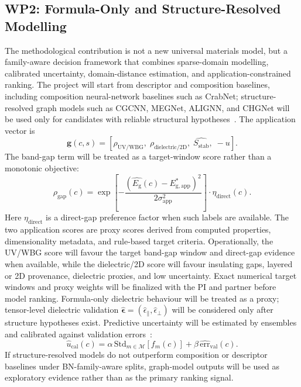 \documentclass[10pt,a4paper]{article}
\newcommand{\eg}{E_{\mathrm{g}}}
\newcommand{\unc}{u}
\newcommand{\stab}{S_{\mathrm{stab}}}
\newcommand{\gapscore}{\rho_{\mathrm{gap}}}
\begin{document}
\subsection{WP2: Formula-Only and Structure-Resolved Modelling}
The methodological contribution is not a new universal materials model, but a family-aware decision framework that combines sparse-domain modelling, calibrated uncertainty, domain-distance estimation, and application-constrained ranking. The project will start from descriptor and composition baselines, including composition neural-network baselines such as CrabNet; structure-resolved graph models such as CGCNN, MEGNet, ALIGNN, and CHGNet will be used only for candidates with reliable structural hypotheses~\cite{ong2013_pymatgen,wang2021_crabnet,xie2018_cgcnn,chen2019_megnet,choudhary2021_alignn,deng2023_chgnet}. The application vector is
\[
  \mathbf{g}(c,s)=
  [\rho_{\mathrm{UV/WBG}},\;\rho_{\mathrm{dielectric/2D}},\;
  \hat{\stab},\;-\unc].
\]
The band-gap term will be treated as a target-window score rather than a monotonic objective:
\[
  \gapscore(c)=
  \exp\!\left[-\frac{(\hat{\eg}(c)-E^*_{\mathrm{g,app}})^2}{2\sigma_{\mathrm{app}}^2}\right]
  \cdot\eta_{\mathrm{direct}}(c).
\]
Here $\eta_{\mathrm{direct}}$ is a direct-gap preference factor when such labels are available. The two application scores are proxy scores derived from computed properties, dimensionality metadata, and rule-based target criteria. Operationally, the UV/WBG score will favour the target band-gap window and direct-gap evidence when available, while the dielectric/2D score will favour insulating gaps, layered or 2D provenance, dielectric proxies, and low uncertainty. Exact numerical target windows and proxy weights will be finalized with the PI and partner before model ranking. Formula-only dielectric behaviour will be treated as a proxy; tensor-level dielectric validation $\hat{\boldsymbol{\epsilon}}=(\hat{\epsilon}_{\parallel},\hat{\epsilon}_{\perp})$ will be considered only after structure hypotheses exist. Predictive uncertainty will be estimated by ensembles and calibrated against validation errors~\cite{gal2016_dropout,lakshminarayanan2017_ensembles}:
\[
  \hat{\unc}_{\mathrm{cal}}(c)=
  \alpha\,\mathrm{Std}_{m\in\mathcal{M}}\!\left[f_m(c)\right]+
  \beta\,\widehat{\mathrm{err}}_{\mathrm{val}}(c).
\]
If structure-resolved models do not outperform composition or descriptor baselines under BN-family-aware splits, graph-model outputs will be used as exploratory evidence rather than as the primary ranking signal.
\end{document}
